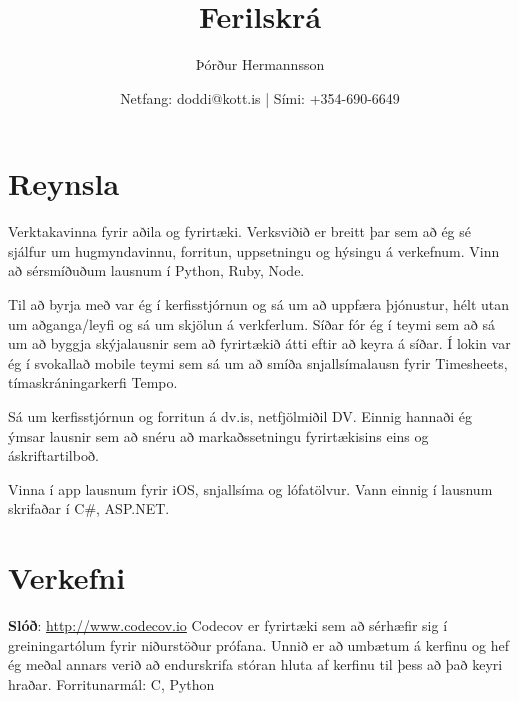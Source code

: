 \documentclass{cv_styles}
\title{Ferilskrá}
\author{Þórður Hermannsson}
\date{Netfang: doddi@kott.is | Sími: +354-690-6649}
\begin{document}
\setcounter{secnumdepth}{0} %
\maketitle
\section{Reynsla}
Verktakavinna fyrir aðila og fyrirtæki. Verksviðið er breitt þar sem að 
ég sé sjálfur um hugmyndavinnu, forritun, uppsetningu og hýsingu á verkefnum.
Vinn að sérsmíðuðum lausnum í Python, Ruby, Node.


Til að byrja með var ég í kerfisstjórnun og sá um að uppfæra þjónustur, hélt utan um aðganga/leyfi og sá um skjölun á verkferlum. Síðar fór ég í teymi sem að sá um að byggja skýjalausnir sem að fyrirtækið átti eftir að keyra á síðar. Í lokin var ég í svokallað mobile teymi sem sá um að smíða snjallsímalausn fyrir Timesheets, tímaskráningarkerfi Tempo.

Sá um kerfisstjórnun og forritun á dv.is, netfjölmiðil DV. Einnig hannaði ég ýmsar lausnir sem að snéru að markaðssetningu fyrirtækisins eins og áskriftartilboð.

Vinna í app lausnum fyrir iOS, snjallsíma og lófatölvur. Vann einnig í lausnum skrifaðar í C\#, ASP.NET.

\section{Verkefni}
\textbf{Slóð}: \href{http://www.codecov.io}{http://www.codecov.io} \newline
Codecov er fyrirtæki sem að sérhæfir sig í greiningartólum fyrir niðurstöður prófana.
Unnið er að umbætum á kerfinu og hef ég meðal annars verið að endurskrifa stóran hluta af kerfinu til þess að það keyri hraðar.
Forritunarmál: C, Python
\end{document}
